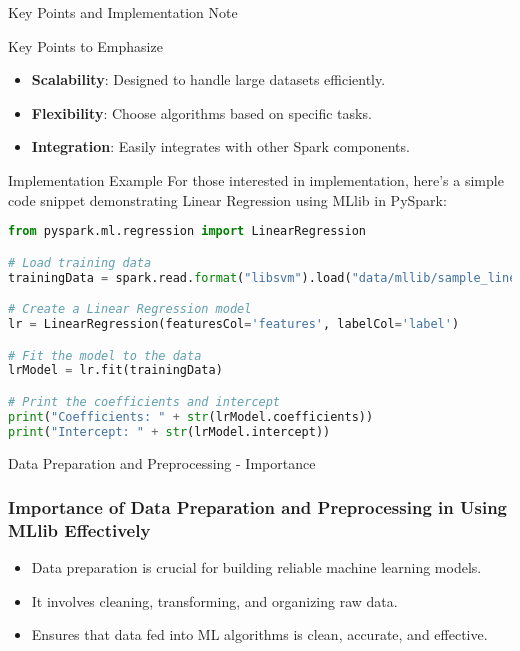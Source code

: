 \documentclass[aspectratio=169]{beamer}
\begin{document}
\begin{frame}[fragile]{Key Points and Implementation Note}
  \begin{block}{Key Points to Emphasize}
    \begin{itemize}
      \item \textbf{Scalability}: Designed to handle large datasets efficiently.
      \item \textbf{Flexibility}: Choose algorithms based on specific tasks.
      \item \textbf{Integration}: Easily integrates with other Spark components.
    \end{itemize}
  \end{block}

  \begin{block}{Implementation Example}
    For those interested in implementation, here’s a simple code snippet demonstrating Linear Regression using MLlib in PySpark:
    \begin{lstlisting}[language=Python]
from pyspark.ml.regression import LinearRegression

# Load training data
trainingData = spark.read.format("libsvm").load("data/mllib/sample_linear_regression_data.txt")

# Create a Linear Regression model
lr = LinearRegression(featuresCol='features', labelCol='label')

# Fit the model to the data
lrModel = lr.fit(trainingData)

# Print the coefficients and intercept
print("Coefficients: " + str(lrModel.coefficients))
print("Intercept: " + str(lrModel.intercept))
    \end{lstlisting}
  \end{block}
\end{frame}

\begin{frame}[fragile]{Data Preparation and Preprocessing - Importance}
    \frametitle{Importance of Data Preparation and Preprocessing in Using MLlib Effectively}
    \begin{itemize}
        \item Data preparation is crucial for building reliable machine learning models.
        \item It involves cleaning, transforming, and organizing raw data.
        \item Ensures that data fed into ML algorithms is clean, accurate, and effective.
    \end{itemize}
\end{frame}
\end{document}
